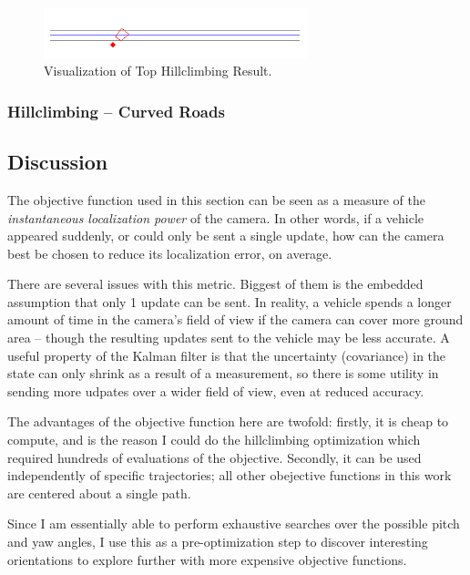 \documentclass[a4paper,12pt,twoside,openright]{report}
\begin{document}
\begin{figure}[htb]
    \centering
    \includegraphics[width=3in]{figures/simple_objective/top_hillclimb.png}
    \caption[Top Hillclimbing Result]{Visualization of Top Hillclimbing Result.}
    \label{fig:simpleobjective:hillclimb result}
\end{figure}

\subsubsection{Hillclimbing -- Curved Roads}



\subsection{Discussion}

The objective function used in this section can be seen as
a measure of the \textit{instantaneous localization power}
of the camera. In other words, if a vehicle appeared suddenly, or
could only be sent a single update, how can the camera best be chosen
to reduce its localization error, on average.

There are several issues with this metric. Biggest of them
is the embedded assumption that only 1 update can be sent.
In reality, a vehicle spends a longer amount of time in the camera's
field of view if the camera can cover more ground area -- 
though the resulting updates sent to the vehicle may be
less accurate. A useful property of the Kalman
filter is that the uncertainty (covariance) in the state
can only shrink as a result of a measurement, so there is some
utility in sending more udpates over a wider field of view,
even at reduced accuracy. 

The advantages of the objective function here are twofold:
firstly, it is cheap to compute, and is the reason I could
do the hillclimbing optimization which
required hundreds of evaluations of the objective. Secondly,
it can be used independently of specific trajectories; all
other obejective functions in this work are centered about
a single path.

Since I am essentially able to perform exhaustive searches
over the possible pitch and yaw angles, I use this
as a pre-optimization step to discover interesting orientations
to explore further with more expensive objective functions.
\end{document}
